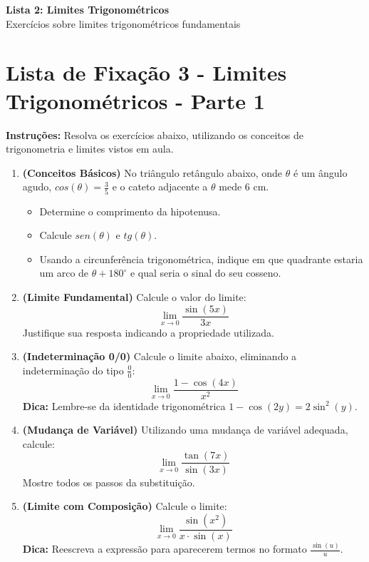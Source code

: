 \documentclass[12pt,a4paper]{article}
\begin{document}
\begin{center}
  {\LARGE\bfseries\color{primary} Lista 2: Limites Trigonométricos} \\[0.1cm]
  {\small\sffamily\color{gray} Exercícios sobre limites trigonométricos fundamentais}
\end{center}

\vspace{0.2cm}


\section*{Lista de Fixação 3 - Limites Trigonométricos - Parte 1}

\textbf{Instruções:} Resolva os exercícios abaixo, utilizando os conceitos de trigonometria e limites vistos em aula.

\begin{enumerate}
    \item \textbf{(Conceitos Básicos)} No triângulo retângulo abaixo, onde $\theta$ é um ângulo agudo, $cos(\theta) = \frac{3}{5}$ e o cateto adjacente a $\theta$ mede 6 cm.
    \begin{itemize}
        \item[(a)] Determine o comprimento da hipotenusa.
        \item[(b)] Calcule $sen(\theta)$ e $tg(\theta)$.
        \item[(c)] Usando a circunferência trigonométrica, indique em que quadrante estaria um arco de $\theta + 180^\circ$ e qual seria o sinal do seu cosseno.
    \end{itemize}

    \item \textbf{(Limite Fundamental)} Calcule o valor do limite:
    \[
    \lim_{x \to 0} \frac{\sin(5x)}{3x}
    \]
    Justifique sua resposta indicando a propriedade utilizada.

    \item \textbf{(Indeterminação 0/0)} Calcule o limite abaixo, eliminando a indeterminação do tipo $\frac{0}{0}$:
    \[
    \lim_{x \to 0} \frac{1 - \cos(4x)}{x^2}
    \]
    \textbf{Dica:} Lembre-se da identidade trigonométrica $1 - \cos(2y) = 2\sin^2(y)$.

    \item \textbf{(Mudança de Variável)} Utilizando uma mudança de variável adequada, calcule:
    \[
    \lim_{x \to 0} \frac{\tan(7x)}{\sin(3x)}
    \]
    Mostre todos os passos da substituição.

    \item \textbf{(Limite com Composição)} Calcule o limite:
    \[
    \lim_{x \to 0} \frac{\sin(x^2)}{x \cdot \sin(x)}
    \]
    \textbf{Dica:} Reescreva a expressão para aparecerem termos no formato $\frac{\sin(u)}{u}$.

\end{enumerate}
\end{document}
